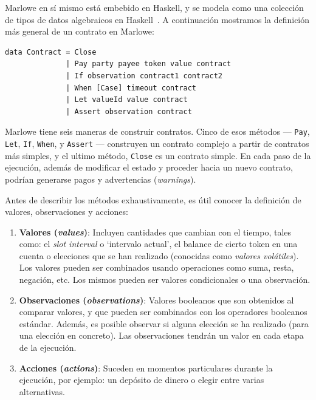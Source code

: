 \documentclass[12pt]{book}
\begin{document}
Marlowe en sí mismo está embebido en Haskell, y se modela como una colección de tipos de datos algebraicos en Haskell~\cite{Algebraic_data_type}. A continuación mostramos la definición más general de un contrato en Marlowe:

\begin{lstlisting}[style=Haskell-cardano, language=Marlowe, caption=Tipos de contratos en Marlowe.]
data Contract = Close
              | Pay party payee token value contract
              | If observation contract1 contract2
              | When [Case] timeout contract
              | Let valueId value contract
              | Assert observation contract
\end{lstlisting}

Marlowe tiene seis maneras de construir contratos. Cinco de esos métodos ---
\texttt{Pay}, \texttt{Let}, \texttt{If}, \texttt{When}, y \texttt{Assert} --- construyen un contrato complejo a partir de contratos más simples, y el ultimo método, \texttt{Close} es un contrato simple. En cada paso de la ejecución, además de modificar el estado y proceder hacia un nuevo contrato, podrían generarse pagos y advertencias (\textit{warnings}).

Antes de describir los métodos exhaustivamente, es útil conocer la definición de valores, observaciones y acciones:

\begin{enumerate}
    \item \textbf{Valores (\textit{values})}: Incluyen cantidades que cambian con el tiempo, tales como: el \textit{slot interval} o `intervalo actual', el balance de cierto token en una cuenta o elecciones que se han realizado (conocidas como \textit{valores volátiles}). Los valores pueden ser combinados usando operaciones como suma, resta, negación, etc. Los mismos pueden ser valores condicionales o una observación.

	\item \textbf{Observaciones (\textit{observations})}: Valores booleanos que son obtenidos al comparar valores, y que pueden ser combinados con los operadores booleanos estándar. Además, es posible observar si alguna elección se ha realizado (para una elección en concreto). Las observaciones tendrán un valor en cada etapa de la ejecución.

	\item \textbf{Acciones (\textit{actions})}: Suceden en momentos particulares durante la ejecución, por ejemplo: un depósito de dinero o elegir entre varias alternativas.
\end{enumerate}
\end{document}
